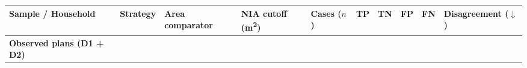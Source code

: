 \documentclass[12pt,letterpaper]{article}
\begin{document}
\begin{landscape}
{\def\LTcaptype{none} %
\begin{longtable}[]{@{}
  >{\raggedright\arraybackslash}p{}
  >{\raggedright\arraybackslash}p{}
  >{\raggedright\arraybackslash}p{}
  >{\raggedleft\arraybackslash}p{}
  >{\raggedleft\arraybackslash}p{}
  >{\raggedleft\arraybackslash}p{}
  >{\raggedleft\arraybackslash}p{}
  >{\raggedleft\arraybackslash}p{}
  >{\raggedleft\arraybackslash}p{}
  >{\raggedleft\arraybackslash}p{}@{}}
\toprule\noalign{}
\begin{minipage}[b]{\linewidth}\raggedright
Sample / Household
\end{minipage} & \begin{minipage}[b]{\linewidth}\raggedright
Strategy
\end{minipage} & \begin{minipage}[b]{\linewidth}\raggedright
Area comparator
\end{minipage} & \begin{minipage}[b]{\linewidth}\raggedleft
NIA cutoff (m\textsuperscript{2})
\end{minipage} & \begin{minipage}[b]{\linewidth}\raggedleft
Cases (\(n\))
\end{minipage} & \begin{minipage}[b]{\linewidth}\raggedleft
TP
\end{minipage} & \begin{minipage}[b]{\linewidth}\raggedleft
TN
\end{minipage} & \begin{minipage}[b]{\linewidth}\raggedleft
FP
\end{minipage} & \begin{minipage}[b]{\linewidth}\raggedleft
FN
\end{minipage} & \begin{minipage}[b]{\linewidth}\raggedleft
Disagreement (\ensuremath{\downarrow})
\end{minipage} \\
\midrule\noalign{}
\endhead
\bottomrule\noalign{}
\endlastfoot
\textbf{Observed plans (D1 + D2)} & & & & & & & & & \\

\end{longtable}}
\end{landscape}
\end{document}
